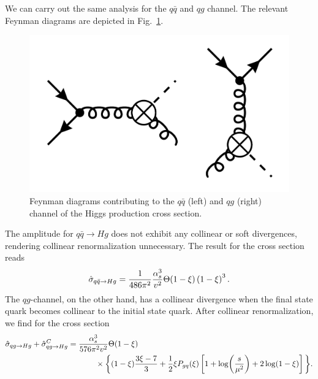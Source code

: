 We can carry out the same analysis for the $q \bar{q}$ and $q g$ channel. The relevant Feynman diagrams are depicted in Fig.~\ref{fig:4:qqHg}.
\begin{figure}[ht]
\centering
\includegraphics[scale=0.15]{Images/NLO_Feynman_diagrams/qqHg.pdf}
\caption{Feynman diagrams contributing to the $q \bar{q}$ (left) and $q g$ (right) channel of the Higgs production cross section.}
\label{fig:4:qqHg}
\end{figure}
The amplitude for $q \bar{q} \rightarrow H g$ does not exhibit any collinear or soft divergences, rendering collinear renormalization unnecessary. The result for the cross section reads
\begin{equation}
\hat{\sigma}_{q \bar{q} \rightarrow H g} = \frac{1}{486 \pi^2} \frac{\alpha_s^3}{v^2} \Theta (1 - \xi) \left(1 - \xi \right)^3.
\end{equation}
The $qg$-channel, on the other hand, has a collinear divergence when the final state quark becomes collinear to the initial state quark. After collinear renormalization, we find for the cross section
\begin{equation}
\begin{split}
&\hat{\sigma}_{qg \rightarrow Hg} + \hat{\sigma}_{qg \rightarrow Hg}^C = \frac{\alphas^3}{576 \pi^2 v^2} \Theta (1 - \xi) \\
& \hspace{4cm} \times \bigg \lbrace (1 - \xi) \frac{3 \xi - 7}{3} + \frac{1}{2} \xi P_{gq}(\xi) \left[1 + \log\!\left(\frac{s}{\mu^2} \right) +2 \log\!\left(1 - \xi \right) \right] \bigg \rbrace.
\end{split}
\end{equation}

